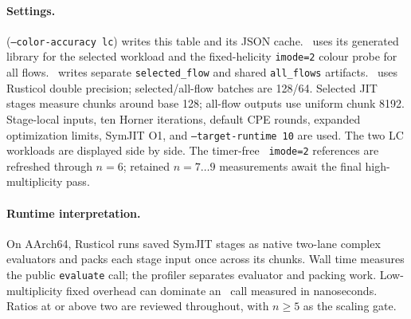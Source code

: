 \begin{landscape}
\paragraph{Settings.}
\noindent\scriptsize {} (\texttt{--color-accuracy lc}) writes this table and its JSON cache. \AC\ uses its generated library for the selected workload and the fixed-helicity \texttt{imode=2} colour probe for all flows. \PAC\ writes separate \texttt{selected\_flow} and shared \texttt{all\_flows} artifacts. \PAC\ uses Rusticol double precision; selected/all-flow batches are 128/64.  Selected JIT stages measure chunks around base 128; all-flow outputs use uniform chunk 8192.  Stage-local inputs, ten Horner iterations, default CPE rounds, expanded optimization limits, SymJIT O1, and \texttt{--target-runtime 10} are used. The two LC workloads are displayed side by side. The timer-free \AC\ \texttt{imode=2} references are refreshed through $n=6$; retained $n=7\ldots9$ measurements await the final high-multiplicity pass.
\par\vspace{0.15em}
\paragraph{Runtime interpretation.}
\noindent\scriptsize On AArch64, Rusticol runs saved SymJIT stages as native two-lane complex evaluators and packs each stage input once across its chunks.  Wall time measures the public \texttt{evaluate} call; the profiler separates evaluator and packing work.  Low-multiplicity fixed overhead can dominate an \AC\ call measured in nanoseconds.  Ratios at or above two are reviewed throughout, with \(n\geq5\) as the scaling gate.
\par\vspace{0.15em}
\end{landscape}

